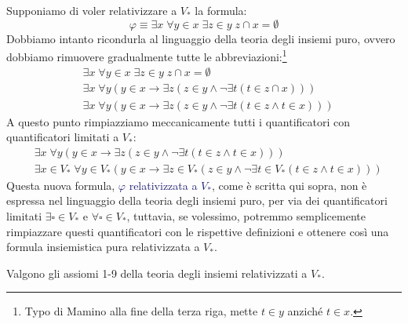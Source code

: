 \begin{example}
	Supponiamo di voler relativizzare a $V_*$ la formula:
	\[ \varphi \equiv \exists x \; \forall y \in x \; \exists z \in y \; z \cap x = \emptyset
		\]
	Dobbiamo intanto ricondurla al linguaggio della teoria degli insiemi puro, ovvero dobbiamo rimuovere gradualmente tutte le abbreviazioni:\footnote{Typo di Mamino alla fine della terza riga, mette $t \in y$ anzich\'e $t \in x$.}
	\begin{align*}
		& \exists x \; \forall y \in x \; \exists z \in y \; z \cap x = \emptyset \\
		& \exists x \; \forall y (y \in x \rightarrow \exists z (z \in y \land \neg \exists t (t \in z \cap x))) \\
		& \exists x \; \forall y (y \in x \rightarrow \exists z (z \in y \land \neg \exists t (t \in z \land t \in x)))
	\end{align*}
	A questo punto rimpiazziamo meccanicamente tutti i quantificatori con quantificatori limitati a $V_*$:
	\begin{align*}
		& \exists x \; \forall y (y \in x \rightarrow \exists z (z \in y \land \neg \exists t (t \in z \land t \in x))) \\
		& \exists x\in V_* \; \forall y \in V_* (y \in x \rightarrow \exists z \in V_* (z \in y \land \neg \exists t \in V_* (t \in z \land t \in x)))
	\end{align*}
	Questa nuova formula, \textcolor{MidnightBlue}{$\varphi$ relativizzata a $V_*$}, come \`e scritta qui sopra, non \`e espressa nel linguaggio della teoria degli insiemi puro, per via dei quantificatori limitati $\exists \square \in V_*$ e $\forall \square \in V_*$,
	tuttavia, se volessimo, potremmo semplicemente rimpiazzare questi quantificatori con le rispettive definizioni e ottenere cos\`i una formula insiemistica pura relativizzata a $V_*$.
\end{example}

\begin{theorem}
	Valgono gli assiomi 1-9 della teoria degli insiemi relativizzati a $V_*$.
\end{theorem}

